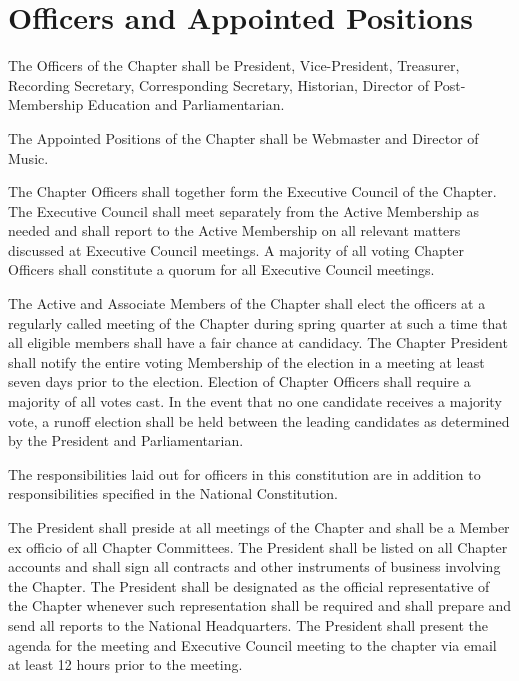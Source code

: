 \documentclass[11pt]{article}
\begin{document}
\section{Officers and Appointed Positions}
\begin{legal}
  \item
    The Officers of the Chapter shall be President, Vice-President, Treasurer, Recording Secretary, Corresponding Secretary, Historian, Director of Post-Membership Education and Parliamentarian.
  \item
    The Appointed Positions of the Chapter shall be Webmaster and Director of Music.
  \item
    The Chapter Officers shall together form the Executive Council of the Chapter.
    The Executive Council shall meet separately from the Active Membership as needed and shall report to the Active Membership on all relevant matters discussed at Executive Council meetings.
    A majority of all voting Chapter Officers shall constitute a quorum for all Executive Council meetings.
  \item
    The Active and Associate Members of the Chapter shall elect the officers at a regularly called meeting of the Chapter during spring quarter at such a time that all eligible members shall have a fair chance at candidacy.
    The Chapter President shall notify the entire voting Membership of the election in a meeting at least seven days prior to the election.
    Election of Chapter Officers shall require a majority of all votes cast.
    In the event that no one candidate receives a majority vote, a runoff election shall be held between the leading candidates as determined by the President and Parliamentarian.
  \item
    The responsibilities laid out for officers in this constitution are in addition to responsibilities specified in the National Constitution.
  \item
    The President shall preside at all meetings of the Chapter and shall be a Member ex officio of all Chapter Committees.
    The President shall be listed on all Chapter accounts and shall sign all contracts and other instruments of business involving the Chapter.
    The President shall be designated as the official representative of the Chapter whenever such representation shall be required and shall prepare and send all reports to the National Headquarters.
    The President shall present the agenda for the meeting and Executive Council meeting to the chapter via email at least 12 hours prior to the meeting.
  \item

\end{legal}
\end{document}
